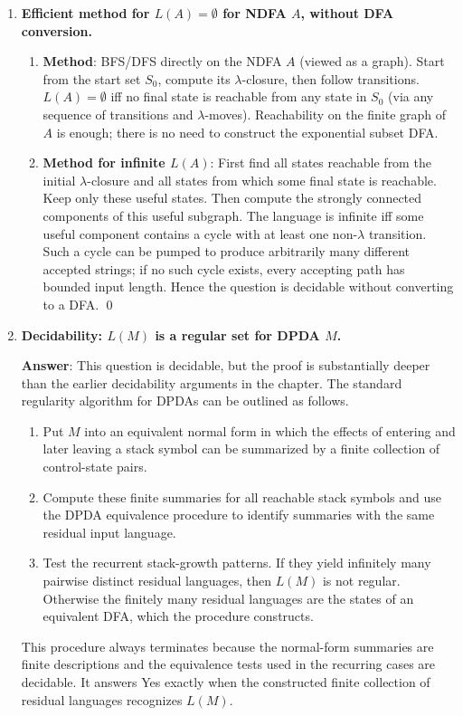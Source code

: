\begin{enumerate}[{12.}1. ]
\item \textbf{Efficient method for $L(A)=\emptyset$ for NDFA $A$, without DFA conversion.}

\begin{enumerate}
\item \textbf{Method}: BFS/DFS directly on the NDFA $A$ (viewed as a graph).
Start from the start set $S_0$, compute its $\lambda$-closure, then follow
transitions. $L(A)=\emptyset$ iff no final state is reachable from any state in
$S_0$ (via any sequence of transitions and $\lambda$-moves). Reachability on the
finite graph of $A$ is enough; there is no need to construct the exponential
subset DFA.

\item \textbf{Method for infinite $L(A)$}: First find all states reachable from
the initial $\lambda$-closure and all states from which some final state is
reachable. Keep only these useful states. Then compute the strongly connected
components of this useful subgraph. The language is infinite iff some useful
component contains a cycle with at least one non-$\lambda$ transition. Such a
cycle can be pumped to produce arbitrarily many different accepted strings; if
no such cycle exists, every accepting path has bounded input length. Hence the
question is decidable without converting to a DFA. \qed
\end{enumerate}

\item \textbf{Decidability: $L(M)$ is a regular set for DPDA $M$.}

\textbf{Answer}: This question is decidable, but the proof is substantially
deeper than the earlier decidability arguments in the chapter. The standard
regularity algorithm for DPDAs can be outlined as follows.
\begin{enumerate}
\item Put $M$ into an equivalent normal form in which the effects of entering
and later leaving a stack symbol can be summarized by a finite collection of
control-state pairs.
\item Compute these finite summaries for all reachable stack symbols and use
the DPDA equivalence procedure to identify summaries with the same residual
input language.
\item Test the recurrent stack-growth patterns. If they yield infinitely many
pairwise distinct residual languages, then $L(M)$ is not regular. Otherwise the
finitely many residual languages are the states of an equivalent DFA, which the
procedure constructs.
\end{enumerate}
This procedure always terminates because the normal-form summaries are finite
descriptions and the equivalence tests used in the recurring cases are
decidable. It answers Yes exactly when the constructed finite collection of
residual languages recognizes $L(M)$.


\end{enumerate}
